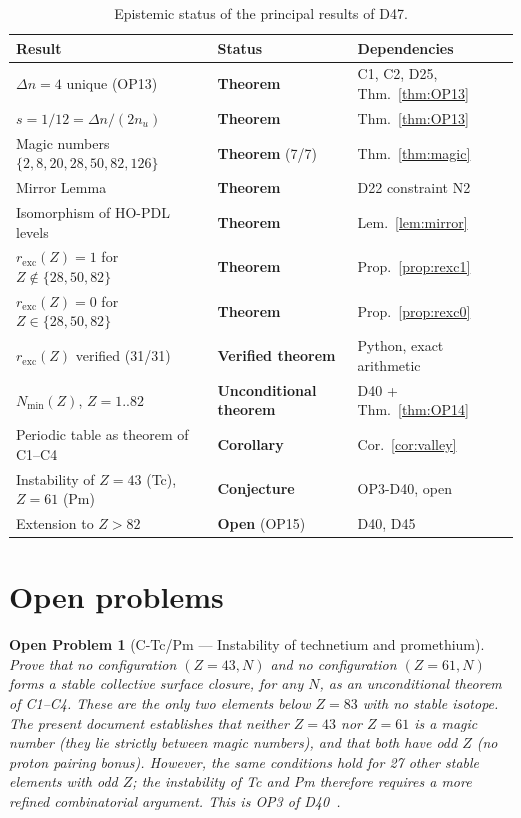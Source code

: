 \documentclass[12pt,a4paper]{article}
\newtheorem{openproblem}{Open Problem}
\newcommand{\nuu}{n_u}
\newcommand{\Dn}{\Delta n}
\newcommand{\Nmin}{N_{\min}}
\newcommand{\rexc}{r_{\mathrm{exc}}}
\begin{document}
\begin{table}[H]
\centering
\caption{Epistemic status of the principal results of D47.}
\label{tab:epistemic}
\small
\begin{tabular}{p{5.5cm}p{3.5cm}p{4.5cm}}
\toprule
Result & Status & Dependencies \\
\midrule
$\Dn = 4$ unique (OP13) & \textbf{Theorem} & C1, C2, D25, Thm.~\ref{thm:OP13} \\
$s = 1/12 = \Dn/(2\nuu)$ & \textbf{Theorem} & Thm.~\ref{thm:OP13} \\
Magic numbers $\{2,8,20,28,50,82,126\}$ & \textbf{Theorem} (7/7) & Thm.~\ref{thm:magic} \\
Mirror Lemma & \textbf{Theorem} & D22 constraint N2 \\
Isomorphism of HO-PDL levels & \textbf{Theorem} & Lem.~\ref{lem:mirror} \\
$\rexc(Z) = 1$ for $Z \notin \{28,50,82\}$ & \textbf{Theorem} & Prop.~\ref{prop:rexc1} \\
$\rexc(Z) = 0$ for $Z \in \{28,50,82\}$ & \textbf{Theorem} & Prop.~\ref{prop:rexc0} \\
$\rexc(Z)$ verified (31/31) & \textbf{Verified theorem} & Python, exact arithmetic \\
$\Nmin(Z)$, $Z=1..82$ & \textbf{Unconditional theorem} & D40 + Thm.~\ref{thm:OP14} \\
Periodic table as theorem of C1--C4 & \textbf{Corollary} & Cor.~\ref{cor:valley} \\
\midrule
Instability of $Z=43$ (Tc), $Z=61$ (Pm) & \textbf{Conjecture} & OP3-D40, open \\
Extension to $Z > 82$ & \textbf{Open} (OP15) & D40, D45 \\
\bottomrule
\end{tabular}
\end{table}

\section{Open problems}
\label{sec:open}

\begin{openproblem}[C-Tc/Pm --- Instability of technetium and promethium]
\label{op:TcPm}
Prove that no configuration $(Z=43, N)$ and no configuration $(Z=61, N)$ forms a stable collective surface closure, for any $N$, as an unconditional theorem of C1--C4. These are the only two elements below $Z = 83$ with no stable isotope. The present document establishes that neither $Z = 43$ nor $Z = 61$ is a magic number (they lie strictly between magic numbers), and that both have odd $Z$ (no proton pairing bonus). However, the same conditions hold for 27 other stable elements with odd $Z$; the instability of Tc and Pm therefore requires a more refined combinatorial argument. This is OP3 of D40~\cite{PDL_D40_2026}.
\end{openproblem}
\end{document}
